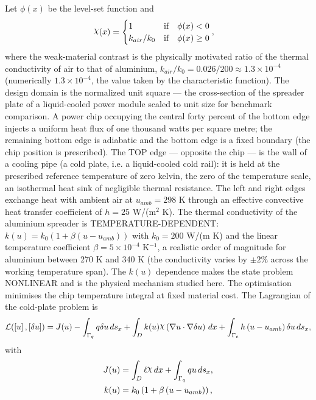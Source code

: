 \documentclass[preview]{standalone}
\let\oldcdot\cdot
\let\cdot\oldcdot
\begin{document}
Let $\phi(x)$ be the level-set function and
 \begin{align*}\raisebox{\depth}{$\chi$}(x) &= \begin{cases} 1 & \mbox{if}\quad \phi(x) < 0 \\ k_{air}/k_0 & \mbox{if}\quad \phi(x)  \ge 0 \end{cases},\end{align*}
where the weak-material contrast is the physically motivated ratio of the thermal conductivity of air to that of aluminium, $k_{air}/k_0 = 0.026/200 \approx 1.3 \times 10^{-4}$ (numerically $1.3 \times 10^{-4}$, the value taken by the characteristic function).
The design domain is the normalized unit square — the cross-section of the spreader plate of a liquid-cooled power module scaled to unit size for benchmark comparison.  A power chip occupying the central forty percent of the bottom edge injects a uniform heat flux of one thousand watts per square metre; the remaining bottom edge is adiabatic and the bottom edge is a fixed boundary (the chip position is prescribed).  The TOP edge — opposite the chip — is the wall of a cooling pipe (a cold plate, i.e. a liquid-cooled cold rail): it is held at the prescribed reference temperature of zero kelvin, the zero of the temperature scale, an isothermal heat sink of negligible thermal resistance.  The left and right edges exchange heat with ambient air at $u_{amb} = 298$ K through an effective convective heat transfer coefficient of $h = 25$ W/(m$^{2}$ K).  The thermal conductivity of the aluminium spreader is TEMPERATURE-DEPENDENT: $k(u) = k_0 \left( 1 + \beta \left( u - u_{amb}\right)\right)$ with $k_0 = 200$ W/(m K) and the linear temperature coefficient $\beta = 5 \times 10^{-4}$ K$^{-1}$, a realistic order of magnitude for aluminium between 270 K and 340 K (the conductivity varies by $\pm 2\%$ across the working temperature span).  The $k(u)$ dependence makes the state problem NONLINEAR and is the physical mechanism studied here.  The optimisation minimises the chip temperature integral at fixed material cost.
The Lagrangian of the cold-plate problem is
\begin{dmath*}
\mathcal L(\left[ u\right],\left[ \delta u\right]) = J(u) -  \int_{\Gamma_q} q  \delta u \,ds_x +  \int_{D} k(u) \raisebox{\depth}{$\chi$} \left(  \nabla u  \cdot  \nabla \delta u  \right) \,dx + \int_{\Gamma_c} h \left( u - u_{amb}\right) \delta u \,ds_x ,
\end{dmath*}
with
\begin{align*}
J(u) &=  \int_{D} \ell \raisebox{\depth}{$\chi$} \,dx + \int_{\Gamma_q} q u \,ds_x ,\\
k(u) &= k_0 \left( 1 + \beta \left( u - u_{amb}\right)\right),
 \end{align*}
\end{document}
